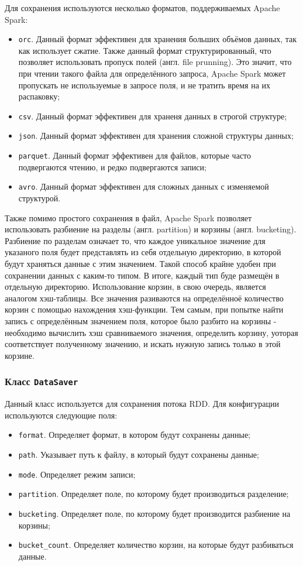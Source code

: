 Для сохранения используются несколько форматов, поддерживаемых Apache Spark:
\begin{itemize}
    \item \texttt{orc}. Данный формат эффективен для хранения больших объёмов данных, так как использует сжатие. Также данный формат структурированный, что позволяет использовать пропуск полей (англ. file prunning). Это значит, что при чтении такого файла для определённого запроса, Apache Spark может пропускать не используемые в запросе поля, и не тратить время на их распаковку;
    \item \texttt{csv}. Данный формат эффективен для храненя данных в строгой структуре;
    \item \texttt{json}. Данный формат эффективен для хранения сложной структуры данных;
    \item \texttt{parquet}. Данный формат эффективен для файлов, которые часто подвергаются чтению, и редко подвергаются записи;
    \item \texttt{avro}. Данный формат эффективен для сложных данных с изменяемой структурой.
\end{itemize}

Также помимо простого сохранения в файл, Apache Spark позволяет использовать разбиение на разделы (англ. partition) и корзины (англ. bucketing).
Разбиение по разделам означает то, что каждое уникальное значение для указаного поля будет представлять из себя отдельную директорию, в которой будут храняться данные с этим значением.
Такой способ крайне удобен при сохранении данных с каким-то типом.
В итоге, каждый тип буде размещён в отдельную директорию.
Использование корзин, в свою очередь, является аналогом хэш-таблицы.
Все значения разиваются на определённоё количество корзин с помощью нахождения хэш-функции.
Тем самым, при попытке найти запись с определённым значением поля, которое было разбито на корзины - необходимо вычислить хэш сравниваемого значения, определить корзину, уоторая соответствует полученному значению, и искать нужную запись только в этой корзине.

\subsubsection{Класс \texttt{DataSaver}}
Данный класс используется для сохранения потока RDD.
Для конфигурации используются следующие поля:
\begin{itemize}
    \item \texttt{format}. Определяет формат, в котором будут сохранены данные;
    \item \texttt{path}. Указывает путь к файлу, в который будут сохранены данные;
    \item \texttt{mode}. Определяет режим записи;
    \item \texttt{partition}. Определяет поле, по которому будет производиться разделение;
    \item \texttt{bucketing}. Определяет поле, по которому будет производится разбиение на корзины;
    \item \texttt{bucket\_count}. Определяет количество корзин, на которые будут разбиваться данные.
\end{itemize}

